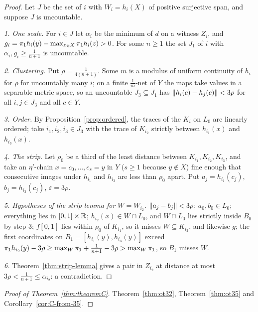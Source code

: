 \begin{proof}
Let $J$ be the set of $i$ with $W_i=h_i(X)$ of positive surjective span, and suppose $J$ is uncountable.

\emph{1. One scale.} For $i\in J$ let $\alpha_i$ be the minimum of $d$ on a witness $Z_i$, and $g_i=\pi_{1}h_i(y)-\max_{z\in X}\pi_{1}h_i(z)>0$. For some $n\ge1$ the set $J_1$ of
$i$ with $\alpha_i,g_i\ge\frac1{n+1}$ is uncountable.

\emph{2. Clustering.} Put $\rho=\frac1{4(n+1)}$. Some $m$ is a modulus of uniform continuity of $h_i$ for $\rho$ for uncountably many $i$; on a finite $\frac1m$-net
of $Y$ the maps take values in a separable metric space, so an uncountable $J_3\subseteq J_1$ has $\lVert h_i(c)-h_j(c)\rVert<3\rho$ for all $i,j\in J_3$ and all $c\in Y$.

\emph{3. Order.} By Proposition~\ref{prop:ordered}, the traces of the $K_i$ on $L_0$ are linearly ordered; take $i_1,i_2,i_3\in J_3$ with the trace of $K_{i_2}$ strictly between
$h_{i_1}(x)$ and $h_{i_3}(x)$.

\emph{4. The strip.} Let $\rho_0$ be a third of the least distance between $K_{i_1},K_{i_2},K_{i_3}$, and take an $\eta'$-chain $x=c_0,\dots,c_s=y$ in $Y$ ($s\ge1$ because
$y\notin X$) fine enough that consecutive images under $h_{i_1}$ and $h_{i_3}$ are less than $\rho_0$ apart. Put $a_j=h_{i_1}(c_j)$, $b_j=h_{i_3}(c_j)$, $\varepsilon=3\rho$.

\emph{5. Hypotheses of the strip lemma for $W=W_{i_2}$.} $\lVert a_j-b_j\rVert<3\rho$; $a_0,b_0\in L_0$; everything lies in $[0,1]\times\mathbb{R}$; $h_{i_2}(x)\in W\cap L_0$, and $W\cap L_0$ lies
strictly inside $B_0$ by step 3; $f[0,1]$ lies within $\rho_0$ of $K_{i_1}$, so it misses $W\subseteq K_{i_2}$, and likewise $g$; the first coordinates on $B_1=[h_{i_1}(y),h_{i_3}(y)]$
exceed $\pi_{1}h_{i_2}(y)-3\rho\ge\max_W\pi_{1}+\frac1{n+1}-3\rho>\max_W\pi_{1}$, so $B_1$ misses $W$.

\emph{6.} Theorem~\ref{thm:strip-lemma} gives a pair in $Z_{i_2}$ at distance at most $3\rho<\frac1{n+1}\le\alpha_{i_2}$: a contradiction.
\end{proof}


\begin{proof}[Proof of Theorem~\ref{thm:theoremC}]
Theorem~\ref{thm:ot32}, Theorem~\ref{thm:ot35} and Corollary~\ref{cor:C-from-35}.
\end{proof}


